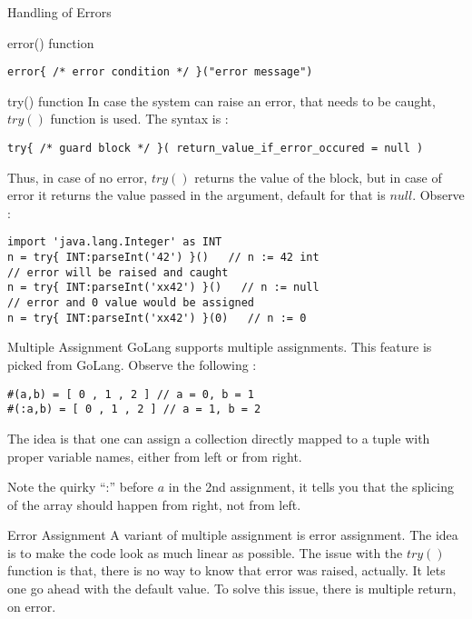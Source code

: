 \begin{section}{Handling of Errors}
\begin{subsection}{error() function}
\begin{lstlisting}[style=JexlStyle]
error{ /* error condition */ }("error message")   
\end{lstlisting}

\end{subsection}

\begin{subsection}{try() function}
In case the system can raise an error, that needs to be caught, 
$try()$ function is used. The syntax is :

\begin{lstlisting}[style=JexlStyle]
try{ /* guard block */ }( return_value_if_error_occured = null )   
\end{lstlisting}
Thus, in case of no error, $try()$ returns the value of the block, but in case 
of error it returns the value passed in the argument, default for that is $null$.
Observe :

\begin{lstlisting}[style=JexlStyle]
import 'java.lang.Integer' as INT 
n = try{ INT:parseInt('42') }()   // n := 42 int 
// error will be raised and caught 
n = try{ INT:parseInt('xx42') }()   // n := null
// error and 0 value would be assigned 
n = try{ INT:parseInt('xx42') }(0)   // n := 0
\end{lstlisting}

\end{subsection}

\begin{subsection}{Multiple Assignment}
GoLang supports multiple assignments. This feature is picked from GoLang.
Observe the following :

\begin{lstlisting}[style=JexlStyle]
#(a,b) = [ 0 , 1 , 2 ] // a = 0, b = 1 
#(:a,b) = [ 0 , 1 , 2 ] // a = 1, b = 2 
\end{lstlisting}

The idea is that one can assign a collection 
directly mapped to a tuple with proper variable names, 
either from left or from right. 

Note the quirky ``:'' before $a$
in the 2nd assignment, it tells you that the splicing of the array
should happen from right, not from left.

\end{subsection}

\begin{subsection}{Error Assignment}
A variant of multiple assignment is error assignment.
The idea is to make the code look as much linear as possible.
The issue with the $try()$ function is that, there is no way to know
that error was raised, actually. It lets one go ahead with the default value.
To solve this issue, there is multiple return, on error.


\end{subsection}
\end{section}
